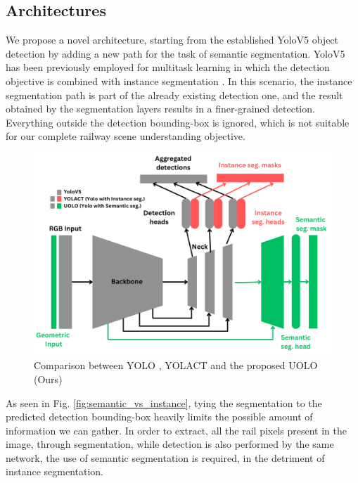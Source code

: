 \documentclass[conference]{IEEEtran}
\begin{document}
\subsection{Architectures}

We propose a novel architecture, starting from the established YoloV5 
\cite{bochkovskiy2020yolov4} \cite{glenn_jocher_2020_4154370}
object detection by adding a new path for the task of semantic segmentation. YoloV5 has been previously employed for multitask learning in which the detection objective is combined with instance segmentation 
\cite{bolya2019yolact}. 
In this scenario, 
the instance segmentation path is part of the already existing detection one, and the result obtained by the segmentation layers results in a finer-grained detection. Everything outside the detection bounding-box is ignored, which is not suitable for our complete railway scene understanding objective.

\begin{figure}[htb]
    \centering
	\centerline{\includegraphics[scale=0.7]{figures/det_sem_instance3.png}}
	\caption{Comparison between YOLO \cite{bochkovskiy2020yolov4} \cite{glenn_jocher_2020_4154370}, YOLACT \cite{bolya2019yolact} and the proposed UOLO (Ours)}
	\label{fig:yoloactuolo}
\end{figure}

As seen in Fig. \ref{fig:semantic_vs_instance}, tying the segmentation to the predicted detection bounding-box heavily limits the possible amount of information we can gather. In order to extract, all the rail pixels present in the image, through segmentation, while detection is also performed by the same network, the use of semantic segmentation is required, in the detriment of instance segmentation.
\end{document}
